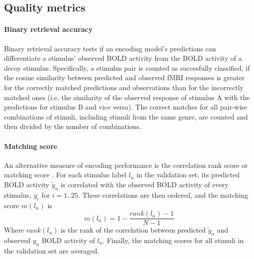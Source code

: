 \subsection*{Quality metrics} 

\paragraph{Binary retrieval accuracy}

Binary retrieval accuracy \citep{ML08} tests if an encoding model's predictions
can differentiate a stimulus' observed BOLD activity from the BOLD activity of
a decoy stimulus.  Specifically, a stimulus pair is counted as succesfully
classified, if the cosine similarity between predicted and observed f{MRI}
responses is greater for the correctly matched predictions and observations
than for the incorrectly matched ones (i.e. the similarity of the observed
response of stimulus A with the predictions for stimulus B and vice versa).
The correct matches for all pair-wise combinations of stimuli, including
stimuli from the same genre, are counted and then divided by the number of
combinations.

\paragraph{Matching score}
%
An alternative measure of encoding performance is the correlation rank score or
matching score \citep{SF14}. For each stimulus label $l_{n}$ in the validation
set, its predicted BOLD activity $\widetilde{y}_{n}$ is correlated with the
observed BOLD activity of every stimulus, $y_{i}$ for $i=1..25$. These
correlations are then ordered, and the  matching score $m(l_{n})$ is \[
m(l_{n}) = 1-\frac{rank(l_{n})-1}{N-1} \] Where $rank(l_{n})$ is the rank of
the correlation between predicted $\widetilde{y}_{n}$ and observed $y_{n}$ BOLD
activity of $l_{n}$. Finally, the matching scores for all stimuli in the
validation set are averaged.



